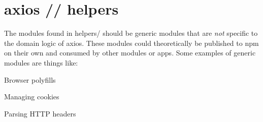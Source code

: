 \chapter{axios // helpers}
\hypertarget{md_node__modules_2axios_2lib_2helpers_2_r_e_a_d_m_e}{}\label{md_node__modules_2axios_2lib_2helpers_2_r_e_a_d_m_e}
\label{md_node__modules_2axios_2lib_2helpers_2_r_e_a_d_m_e_autotoc_md153}%
%
 The modules found in {\ttfamily helpers/} should be generic modules that are {\itshape not} specific to the domain logic of axios. These modules could theoretically be published to npm on their own and consumed by other modules or apps. Some examples of generic modules are things like\+:


\begin{DoxyItemize}
\item Browser polyfills
\item Managing cookies
\item Parsing HTTP headers 
\end{DoxyItemize}